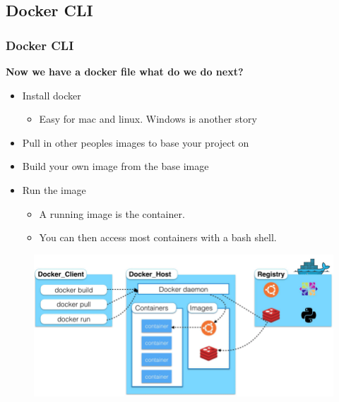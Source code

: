 \documentclass{beamer}
\begin{document}
\subsection{Docker CLI} 
\begin{frame}
    \small
    \frametitle{Docker CLI}
    \textbf{Now we have a docker file what do we do next?}
    \begin{itemize}
        \item Install docker
        \begin{itemize}
            \item  Easy for mac and linux. Windows is another story
        \end{itemize}
        \item Pull in other peoples images to base your project on
        \item Build your own image from the base image
        \item Run the image
        \begin{itemize}
            \item  A running image is the container.
            \item You can then access most containers with a bash shell.
        \end{itemize}
    \end{itemize}
    \begin{figure}
    \includegraphics[scale=0.25]{./pics/High-level-overview-of-Docker-architecture.jpg}
    \end{figure}
\end{frame}
\end{document}
